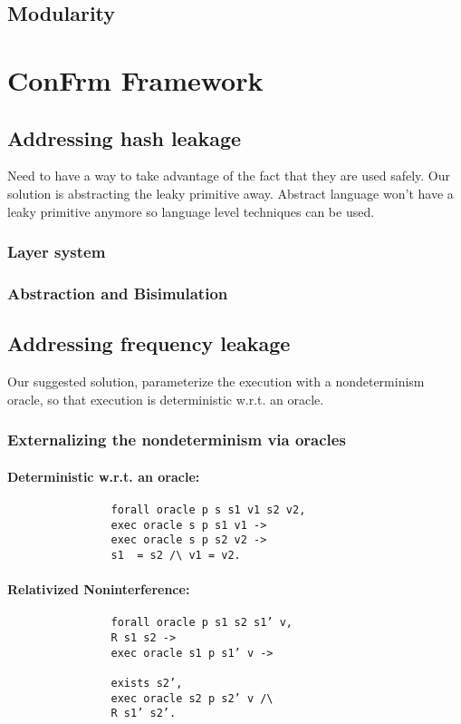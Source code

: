 \documentclass[onecolumn]{paper}
\begin{document}
	\subsection{Modularity}
        \newpage

\section{ConFrm Framework}
	\subsection{Addressing hash leakage}
	Need to have a way to take advantage of the fact that they are used safely.
	Our solution is abstracting the leaky primitive away.
	Abstract language won’t have a leaky primitive anymore so language level techniques can be used.
	
		\subsubsection{Layer system}
		\subsubsection{Abstraction and Bisimulation}

	\subsection{Addressing frequency leakage}
	Our suggested solution, parameterize the execution with a nondeterminism oracle, so that execution is deterministic w.r.t. an oracle.
		
		\subsubsection{Externalizing the nondeterminism via oracles}
			\paragraph{Deterministic w.r.t. an oracle:}
			\begin{verbatim}
				forall oracle p s s1 v1 s2 v2,
				exec oracle s p s1 v1 ->
				exec oracle s p s2 v2 ->
				s1  = s2 /\ v1 = v2.
			\end{verbatim}
	
			\paragraph{Relativized Noninterference:}
			\begin{verbatim}
				forall oracle p s1 s2 s1’ v,
				R s1 s2 ->
				exec oracle s1 p s1’ v ->
				
				exists s2’,
				exec oracle s2 p s2’ v /\
				R s1’ s2’.
			\end{verbatim}
						
\end{document}
